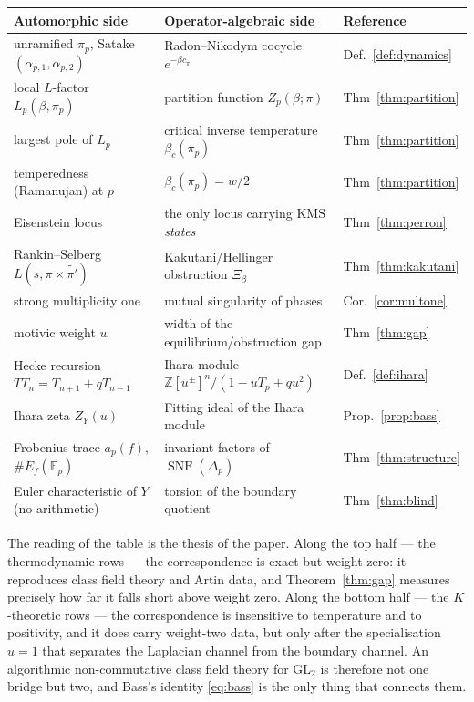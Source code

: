 \documentclass[11pt]{amsart}
\numberwithin{equation}{section}
\theoremstyle{definition}
\theoremstyle{remark}
\newcommand{\Z}{\mathbb{Z}}
\newcommand{\F}{\mathbb{F}}
\newcommand{\SNF}{\operatorname{SNF}}
\newcommand{\KMS}{\mathrm{KMS}}
\newcommand{\GL}{\mathrm{GL}}
\begin{document}
\begin{center}\small
\renewcommand{\arraystretch}{1.2}
\begin{tabular}{lll}
\toprule
Automorphic side & Operator-algebraic side & Reference\\
\midrule
unramified $\pi_p$, Satake $(\alpha_{p,1},\alpha_{p,2})$
& Radon--Nikodym cocycle $e^{-\beta c_\pi}$ & Def.~\ref{def:dynamics}\\
local $L$-factor $L_p(\beta,\pi_p)$
& partition function $Z_p(\beta;\pi)$ & Thm~\ref{thm:partition}\\
largest pole of $L_p$
& critical inverse temperature $\beta_c(\pi_p)$ & Thm~\ref{thm:partition}\\
temperedness (Ramanujan) at $p$
& $\beta_c(\pi_p)=w/2$ & Thm~\ref{thm:partition}\\
Eisenstein locus
& the only locus carrying $\KMS$ \emph{states} & Thm~\ref{thm:perron}\\
Rankin--Selberg $L(s,\pi\times\widetilde{\pi'})$
& Kakutani/Hellinger obstruction $\Xi_\beta$ & Thm~\ref{thm:kakutani}\\
strong multiplicity one
& mutual singularity of phases & Cor.~\ref{cor:multone}\\
motivic weight $w$
& width of the equilibrium/obstruction gap & Thm~\ref{thm:gap}\\
Hecke recursion $T T_n=T_{n+1}+qT_{n-1}$
& Ihara module $\Z[u^{\pm}]^n/(1-uT_p+qu^2)$ & Def.~\ref{def:ihara}\\
Ihara zeta $Z_Y(u)$
& Fitting ideal of the Ihara module & Prop.~\ref{prop:bass}\\
Frobenius trace $a_p(f)$, $\#E_f(\F_p)$
& invariant factors of $\SNF(\Delta_p)$ & Thm~\ref{thm:structure}\\
Euler characteristic of $Y$ (no arithmetic)
& torsion of the boundary quotient & Thm~\ref{thm:blind}\\
\bottomrule
\end{tabular}
\end{center}

\medskip
The reading of the table is the thesis of the paper. Along the top half --- the
thermodynamic rows --- the correspondence is exact but weight-zero: it reproduces class
field theory and Artin data, and Theorem~\ref{thm:gap} measures precisely how far it
falls short above weight zero. Along the bottom half --- the $K$-theoretic rows --- the
correspondence is insensitive to temperature and to positivity, and it does carry
weight-two data, but only after the specialisation $u=1$ that separates the Laplacian
channel from the boundary channel. An algorithmic non-commutative class field theory for
$\GL_2$ is therefore not one bridge but two, and Bass's identity \eqref{eq:bass} is the
only thing that connects them.
\end{document}
